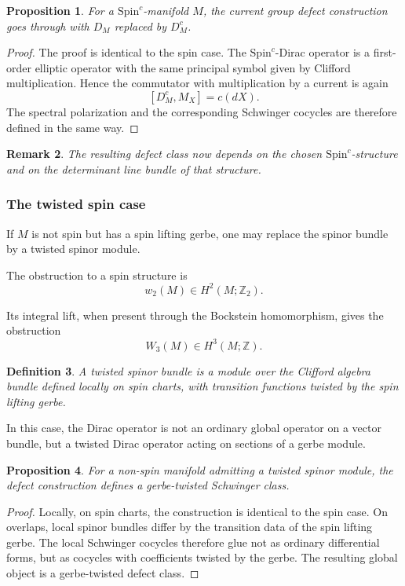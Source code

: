 \documentclass[11pt]{amsart}
\newtheorem{definition}{Definition}[section]
\newtheorem{proposition}[definition]{Proposition}
\newtheorem{remark}[definition]{Remark}
\begin{document}
\begin{proposition}
For a \(\mathrm{Spin}^c\)-manifold \(M\), the current group defect construction goes through with \(D_M\) replaced by \(D_M^c\).
\end{proposition}

\begin{proof}
The proof is identical to the spin case. The \(\mathrm{Spin}^c\)-Dirac operator is a first-order elliptic operator with the same principal symbol given by Clifford multiplication. Hence the commutator with multiplication by a current is again
\[
[D_M^c,M_X]=c(dX).
\]
The spectral polarization and the corresponding Schwinger cocycles are therefore defined in the same way.
\end{proof}

\begin{remark}
The resulting defect class now depends on the chosen \(\mathrm{Spin}^c\)-structure and on the determinant line bundle of that structure.
\end{remark}

\subsubsection{The twisted spin case}

If \(M\) is not spin but has a spin lifting gerbe, one may replace the spinor bundle by a twisted spinor module.

The obstruction to a spin structure is
\[
w_2(M)\in H^2(M;\mathbb Z_2).
\]

Its integral lift, when present through the Bockstein homomorphism, gives the obstruction
\[
W_3(M)\in H^3(M;\mathbb Z).
\]

\begin{definition}
A twisted spinor bundle is a module over the Clifford algebra bundle defined locally on spin charts, with transition functions twisted by the spin lifting gerbe.
\end{definition}

In this case, the Dirac operator is not an ordinary global operator on a vector bundle, but a twisted Dirac operator acting on sections of a gerbe module.

\begin{proposition}
For a non-spin manifold admitting a twisted spinor module, the defect construction defines a gerbe-twisted Schwinger class.
\end{proposition}

\begin{proof}
Locally, on spin charts, the construction is identical to the spin case. On overlaps, local spinor bundles differ by the transition data of the spin lifting gerbe. The local Schwinger cocycles therefore glue not as ordinary differential forms, but as cocycles with coefficients twisted by the gerbe. The resulting global object is a gerbe-twisted defect class.
\end{proof}
\end{document}
